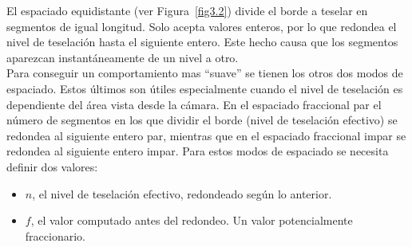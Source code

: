 El espaciado equidistante (ver Figura~\ref{fig3.2}) divide el borde a teselar
en segmentos de igual longitud. Solo acepta valores enteros, por lo que redondea
el nivel de teselación hasta el siguiente entero. Este hecho causa que los
segmentos aparezcan instantáneamente de un nivel a otro.\\

Para conseguir un comportamiento mas ``suave'' se tienen los otros dos modos de
espaciado. Estos últimos son útiles especialmente cuando el nivel de teselación
es dependiente del área vista desde la cámara. En el espaciado fraccional par el
número de segmentos en los que dividir el borde (nivel de teselación efectivo)
se redondea al siguiente entero par, mientras que en el espaciado fraccional
impar se redondea al siguiente entero impar. Para estos modos de espaciado se
necesita definir dos valores:

\begin{itemize}
		\item $n$, el nivel de teselación efectivo, redondeado según lo
				anterior.
		\item $f$, el valor computado antes del redondeo. Un valor
				potencialmente fraccionario.
\end{itemize}

